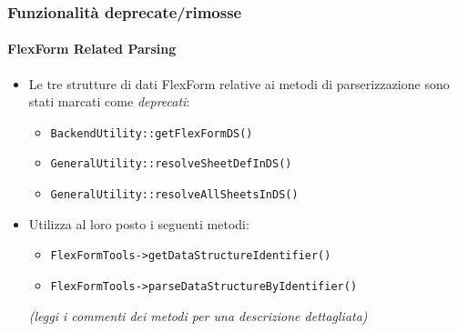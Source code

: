 \begin{frame}[fragile]
	\frametitle{Funzionalità deprecate/rimosse}
	\framesubtitle{FlexForm Related Parsing}

	\begin{itemize}
		\item Le tre strutture di dati FlexForm relative ai metodi di parserizzazione sono stati marcati come \textit{deprecati}:

			\begin{itemize}
				\item \texttt{BackendUtility::getFlexFormDS()}
				\item \texttt{GeneralUtility::resolveSheetDefInDS()}
				\item \texttt{GeneralUtility::resolveAllSheetsInDS()}
			\end{itemize}

		\item Utilizza al loro posto i seguenti metodi:

			\begin{itemize}
				\item \texttt{FlexFormTools->getDataStructureIdentifier()}
				\item \texttt{FlexFormTools->parseDataStructureByIdentifier()}
			\end{itemize}

		\small
			\textit{(leggi i commenti dei metodi per una descrizione dettagliata)}
		\normalsize

	\end{itemize}

\end{frame}







